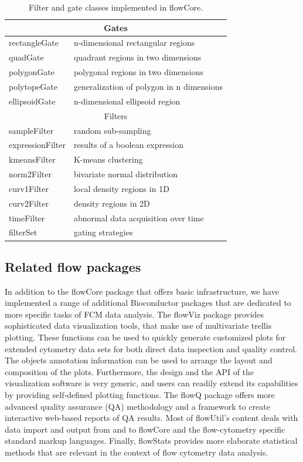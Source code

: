 \documentclass[12pt]{article}
\begin{document}
\begin{table}[ht]
\begin{center}
\begin{tabular}{|l|l|}
\hline
\multicolumn{2}{|c|}{Gates} \\
\hline
rectangleGate & n-dimensional rectangular regions \\
quadGate & quadrant regions in two dimensions \\
polygonGate & polygonal regions in two dimensions \\
polytopeGate & generalization of polygon in n dimensions \\
ellipsoidGate & n-dimensional ellipsoid region \\
\hline
\multicolumn{2}{|c|}{Filters} \\
\hline
sampleFilter & random sub-sampling\\
expressionFilter & results of a boolean expression \\
kmeansFilter & K-means clustering \\
norm2Filter & bivariate normal distribution \\
curv1Filter & local density regions in 1D \\
curv2Filter & density regions in 2D \\
timeFilter & abnormal data acquisition over time \\
\hline
filterSet & gating strategies \\
\hline
\end{tabular}
\caption{\label{table2}Filter and gate classes implemented in flowCore.}
\end{center}
\end{table}

\subsection*{Related flow packages}
In addition to the flowCore package that offers basic infrastructure,
we have implemented a range of additional Bioconductor packages that
are dedicated to more specific tasks of FCM data analysis. The flowViz
package \citep{sarkar2008ufv} provides sophisticated data
visualization tools, that make use of multivariate trellis
plotting. These functions can be used to quickly generate customized
plots for extended cytometry data sets for both direct data inspection
and quality control. The objects annotation information can be used to
arrange the layout and composition of the plots. Furthermore, the
design and the API of the visualization software is very generic, and
users can readily extend its capabilities by providing self-defined
plotting functions.  The flowQ package offers more advanced quality
assurance (QA) methodology and a framework to create interactive
web-based reports of QA results. Most of flowUtil's content deals with
data import and output from and to flowCore and the flow-cytometry
specific standard markup languages. Finally, flowStats provides more
elaborate statistical methods that are relevant in the context of flow
cytometry data analysis.
\end{document}
